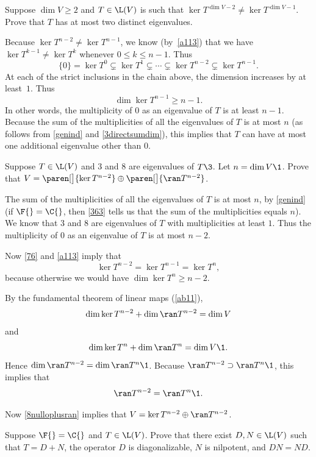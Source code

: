 \exercise
Suppose $\dim V \ge 2$ and $T \in \L(V)$ is such that $\ker T^{\dim V-2\!}  \ne \ker T^{\dim V-1\!}$.
Prove that $T$ has at most two distinct eigenvalues.

\begin{Solution}
Because $\ker T^{n-2} \ne \ker T^{n-1}$, we know (by~\ref{a113}) that we have
$\ker T^{k-1} \ne \ker T^k$ whenever $0 \le k \le n-1$.  Thus
\[
\{0\} = \ker T^0 \subsetneq \ker T^1 \subsetneq \dotsm
\subsetneq \ker T^{n-2} \subsetneq \ker T^{n-1}.
\]
At each of the strict inclusions in the chain above, the dimension increases
by at least~$1$. Thus
\[
\dim \ker T^{n-1} \ge n-1.
\]
In other words, the multiplicity of $0$ as an eigenvalue of $T$ is at least $n-1$. Because the sum of the multiplicities of all the eigenvalues of $T$ is at most $n$ (as follows from \ref{genind} and \ref{3directsumdim}), this implies that $T$ can have at most one additional eigenvalue other than $0$.
\end{Solution}

\exercise
Suppose $T \in \L(V)$ and $3$ and $8$ are eigenvalues of $T\3$. Let $n = \dim V\1$. Prove that
$V = \paren[\big]{\ker T^{n-2}} \oplus \paren[\big]{\ran T^{n-2}}$.

\begin{Solution}
The sum of the multiplicities of all the eigenvalues of $T$ is at most $n$, by \ref{genind} (if $\F{} = \C{}$, then \ref{363} tells us that the sum of the multiplicities equals $n$). We know that $3$ and $8$ are eigenvalues of $T$ with multiplicities at least $1$. Thus the multiplicity of $0$ as an eigenvalue of $T$ is at most $n-2$.

Now \ref{76} and \ref{a113} imply that
\[
\ker T^{n-2} = \ker T^{n-1} = \ker T^n,
\]
because otherwise we would have $\dim \ker T^n \ge n-2$.

By the fundamental theorem of linear maps (\ref{ab11}),
\[
\dim \ker T^{n-2} + \dim \ran T^{n-2} = \dim V
\]
and
\[
\dim \ker T^n + \dim \ran T^n = \dim V\1.
\]
Hence $\dim \ran T^{n-2} = \dim \ran T^n\1$. Because $\ran T^{n-2} \supset \ran T^n\1$, this implies that
\[
\ran T^{n-2} = \ran T^n\1.
\]

Now \ref{8nulloplusran} implies that $V = \ker T^{n-2} \oplus \ran T^{n-2}$.
\end{Solution}

\exercise
Suppose $\F{} = \C{}$ and $T \in \L(V)$. Prove that there exist $D, N \in \L(V)$ such that $T = D + N$, the operator $D$ is diagonalizable, $N$ is nilpotent, and $DN = ND$.

